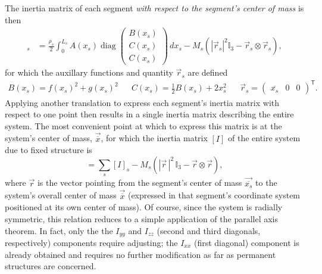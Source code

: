 \documentclass[11pt,dvipsnames]{thesis}
\begin{document}
The inertia matrix of each segment \textit{with respect to the segment's center of mass} is then
\begin{align}
[I]_s &= \frac{\rho_s}{2} \int_{0}^{L_s} A(x_s)
\operatorname{diag}\begin{pmatrix}
B(x_s) \\ C(x_s) \\ C(x_s)
\end{pmatrix}
\,dx_s - M_s(|\vec{r}_s|^2 \mathbb{I}_3 - \vec{r}_s\otimes\vec{r}_s), \label{eq:StructuresInertiaTensorOfSegment}
\end{align}
for which the auxillary functions and quantity $\vec{r}_s$ are defined %
\begin{align}
B(x_s) = f(x_s)^2 + g(x_s)^2 && C(x_s) = \frac{1}{2}B(x_s) + 2 x_s^2 && \vec{r}_s = \begin{pmatrix}\overline{x_s} & 0 & 0\end{pmatrix}^{\!\mathsf{T}}.
\end{align}
 Applying another translation to express each segment's inertia matrix with respect to one point then results in a single inertia matrix describing the entire system. The most convenient point at which to express this matrix is at the system's center of mass, $\vec{\overline{x}}$, for which the inertia matrix $[I]$ of the entire system due to fixed structure is 
\begin{equation}
[I] = \sum_s [I]_s - M_s (|\vec{r}\,|^2 \,\mathbb{I}_3 - \vec{r} \otimes \vec{r}), \label{eq:StructuresMoIStructureFrame}
\end{equation}
where $\vec{r}$ is the vector pointing from the segment's center of mass $\vec{\overline{x_s}}$ to the system's overall center of mass $\vec{\overline{x}}$ (expressed in that segment's coordinate system positioned at its own center of mass). Of course, since the system is radially symmetric, this relation reduces to a simple application of the parallel axis theorem. In fact, only the the $I_{yy}$ and $I_{zz}$ (second and third diagonals, respectively) components require adjusting; the $I_{xx}$ (first diagonal) component is already obtained and requires no further modification as far as permanent structures are concerned.
\end{document}

